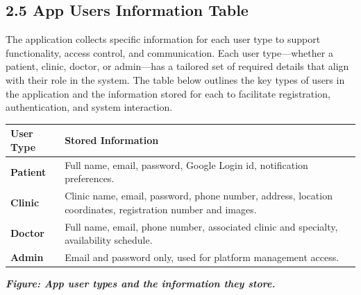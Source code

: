 \documentclass[12pt]{report}
\begin{document}
\subsection*{2.5 App Users Information Table}
\noindent The application collects specific information for each user type to support functionality, access control, and communication. Each user type—whether a patient, clinic, doctor, or admin—has a tailored set of required details that align with their role in the system. The table below outlines the key types of users in the application and the information stored for each to facilitate registration, authentication, and system interaction.
\vspace{0.3cm}
\begin{table}[H]
	\centering
	\renewcommand{\arraystretch}{1.3}
	\begin{tabular}{|p{4cm}|p{11.5cm}|}
		\hline
		\rowcolor[HTML]{C0C0C0}
		\textbf{User Type}             & \textbf{Stored Information}                                               \\
		\hline

		\hspace{1.2cm}\textbf{Patient} &
		Full name, email, password, Google Login id, notification preferences.                                     \\
		\hline

		\hspace{1.4cm}\textbf{Clinic}  &
		Clinic name, email, password, phone number, address, location coordinates, registration number and images. \\
		\hline

		\hspace{1.4cm}\textbf{Doctor}  &
		Full name, email, phone number, associated clinic and specialty, availability schedule.                    \\
		\hline

		\hspace{1.4cm}\textbf{Admin}   &
		Email and password only, used for platform management access.                                              \\
		\hline
	\end{tabular}
	\begin{center}
		\vspace{0.5cm}
		\textit{\textbf{Figure: App user types and the information they store.}}
	\end{center}
\end{table}
\end{document}

